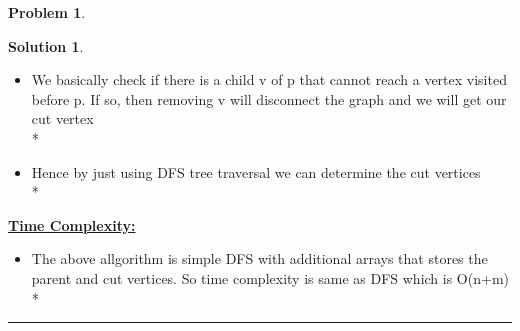 \documentclass{article}
\theoremstyle{definition}
\newtheorem{problem}{Problem}
\def\fline{\rule{0.75\linewidth}{0.5pt}}
\newcommand{\finishline}{\vspace{-15pt}\begin{center}\fline\end{center}}
\newtheorem*{solution*}{Solution}
\newenvironment{solution}{\begin{solution*}}{{\finishline} \end{solution*}}
\begin{document}
\begin{problem}
\begin{enumerate}[label=(\alph*)]
\begin{solution}
\begin{itemize}
					\item We basically check if there is a child v of p that cannot reach a vertex visited before p. If so, then removing v will disconnect the graph and we will get our cut vertex \\*
					\item Hence by just using DFS tree traversal we can determine the cut vertices  \\*
				\end{itemize} 				
			\textbf{\underline{Time Complexity:}}
				\begin{itemize}
					\item The above allgorithm is simple DFS with additional arrays that stores the parent and cut vertices. So time complexity is same as DFS which is O(n+m)\\*
				\end{itemize} 		
\end{solution}

	\end{enumerate}
	
\end{problem}

\smallskip
\end{document}
